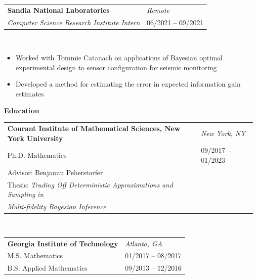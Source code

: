 \documentclass{article}
\begin{document}
\begin{tabular}{p{4.8in}p{2in}}
    \bf{Sandia National Laboratories} & \emph{Remote}\\
    \emph{Computer Science Research Institute Intern} & 06/2021 -- 09/2021 \\
\end{tabular}
\vspace{-0.2in}
\begin{minipage}{0.03\textwidth}
~\\
\end{minipage}
\begin{minipage}{0.7\textwidth}
\begin{itemize}[label=\raisebox{0.25ex}{\tiny$\bullet$}]
    \item Worked with Tommie Catanach on applications of Bayesian optimal experimental design to sensor configuration for seismic monitoring
    \item Developed a method for estimating the error in expected information gain estimates
\end{itemize}
\end{minipage}


\vspace{0.4in}

{\Large\bf Education} \hrulefill \\

\begin{tabular}{p{4.8in}p{2in}}
    \bf{Courant Institute of Mathematical Sciences, New York University}  & \emph{New York, NY} \\
    Ph.D. Mathematics & 09/2017 -- 01/2023 \\
    Advisor: Benjamin Peherstorfer & \\
    Thesis: \emph{Trading Off Deterministic Approximations and Sampling in}\\ \hspace{0.45in} \emph{Multi-fidelity Bayesian Inference} & 
\end{tabular}
~\\

\begin{tabular}{p{4.8in}p{2in}}
    \bf{Georgia Institute of Technology} & \emph{Atlanta, GA}\\
    M.S. Mathematics & 01/2017 -- 08/2017 \\
    B.S. Applied Mathematics & 09/2013 -- 12/2016 \\
\end{tabular}

\vspace{0.25in}
\end{document}
